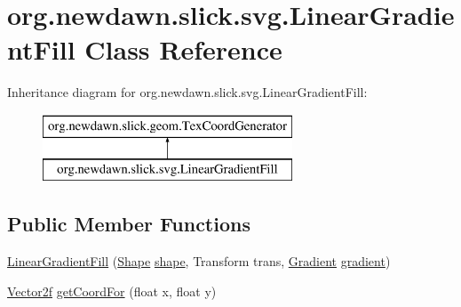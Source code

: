 \hypertarget{classorg_1_1newdawn_1_1slick_1_1svg_1_1_linear_gradient_fill}{}\section{org.\+newdawn.\+slick.\+svg.\+Linear\+Gradient\+Fill Class Reference}
\label{classorg_1_1newdawn_1_1slick_1_1svg_1_1_linear_gradient_fill}
Inheritance diagram for org.\+newdawn.\+slick.\+svg.\+Linear\+Gradient\+Fill\+:\begin{figure}[H]
\begin{center}
\leavevmode
\includegraphics[height=2.000000cm]{classorg_1_1newdawn_1_1slick_1_1svg_1_1_linear_gradient_fill}
\end{center}
\end{figure}
\subsection*{Public Member Functions}
\begin{DoxyCompactItemize}
\item 
\mbox{\hyperlink{classorg_1_1newdawn_1_1slick_1_1svg_1_1_linear_gradient_fill_a84a3511eccce5286be653e3abdeab17c}{Linear\+Gradient\+Fill}} (\mbox{\hyperlink{classorg_1_1newdawn_1_1slick_1_1geom_1_1_shape}{Shape}} \mbox{\hyperlink{classorg_1_1newdawn_1_1slick_1_1svg_1_1_linear_gradient_fill_a8d9085ba4c009c6fce0b06a834ef30e3}{shape}}, Transform trans, \mbox{\hyperlink{classorg_1_1newdawn_1_1slick_1_1svg_1_1_gradient}{Gradient}} \mbox{\hyperlink{classorg_1_1newdawn_1_1slick_1_1svg_1_1_linear_gradient_fill_a91933ccdb47076eca69f1ebe6886933c}{gradient}})
\item 
\mbox{\hyperlink{classorg_1_1newdawn_1_1slick_1_1geom_1_1_vector2f}{Vector2f}} \mbox{\hyperlink{classorg_1_1newdawn_1_1slick_1_1svg_1_1_linear_gradient_fill_a2e7291eea3735f7070d9705dd1f43bb3}{get\+Coord\+For}} (float x, float y)
\end{DoxyCompactItemize}
